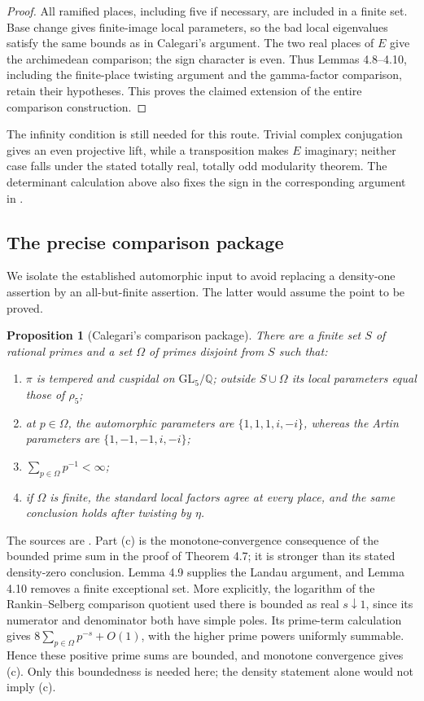 \documentclass[11pt]{article}
\newtheorem{proposition}[theorem]{Proposition}
\theoremstyle{definition}
\theoremstyle{remark}
\newcommand{\Q}{\mathbb Q}
\newcommand{\GL}{\mathrm{GL}}
\newcommand{\rh}{\rho_5}
\numberwithin{equation}{section}
\begin{document}
\begin{proof}
All ramified places, including five if necessary, are included in a finite set. Base change gives finite-image local parameters, so the bad local eigenvalues satisfy the same bounds as in Calegari's argument. The two real places of $E$ give the archimedean comparison; the sign character is even. Thus Lemmas 4.8--4.10, including the finite-place twisting argument and the gamma-factor comparison, retain their hypotheses. This proves the claimed extension of the entire comparison construction.
\end{proof}

The infinity condition is still needed for this route. Trivial complex conjugation gives an even projective lift, while a transposition makes $E$ imaginary; neither case falls under the stated totally real, totally odd modularity theorem. The determinant calculation above also fixes the sign in the corresponding argument in \citet[Section 4.2]{kharelarosawiese}.

\subsection{The precise comparison package}

We isolate the established automorphic input to avoid replacing a density-one assertion by an all-but-finite assertion. The latter would assume the point to be proved.

\begin{proposition}[Calegari's comparison package]\label{prop:package}
There are a finite set $S$ of rational primes and a set $\Omega$ of primes disjoint from $S$ such that:
\begin{enumerate}[label=(\alph*)]
\item $\pi$ is tempered and cuspidal on $\GL_5/\Q$; outside $S\cup\Omega$ its local parameters equal those of $\rh$;
\item at $p\in\Omega$, the automorphic parameters are
$\{1,1,1,i,-i\}$, whereas the Artin parameters are
$\{1,-1,-1,i,-i\}$;
\item $\sum_{p\in\Omega}p^{-1}<\infty$;
\item if $\Omega$ is finite, the standard local factors agree at every place, and the same conclusion holds after twisting by $\eta$.
\end{enumerate}
\end{proposition}

The sources are \citet[Theorem 1.1, Theorem 4.7, Lemmas 4.8--4.10]{calegari}. Part (c) is the monotone-convergence consequence of the bounded prime sum in the proof of Theorem 4.7; it is stronger than its stated density-zero conclusion. Lemma 4.9 supplies the Landau argument, and Lemma 4.10 removes a finite exceptional set.
More explicitly, the logarithm of the Rankin--Selberg comparison quotient used there is bounded as real $s\downarrow1$, since its numerator and denominator both have simple poles. Its prime-term calculation gives $8\sum_{p\in\Omega}p^{-s}+O(1)$, with the higher prime powers uniformly summable. Hence these positive prime sums are bounded, and monotone convergence gives (c). Only this boundedness is needed here; the density statement alone would not imply (c).
\end{document}
